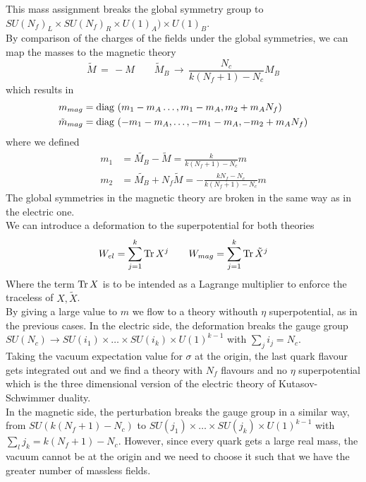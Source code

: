 This mass assignment breaks the global symmetry group to $SU(N_f)_L \times SU(N_f)_R \times U(1)_A) \times U(1)_B$.\\
By comparison of the charges of the fields under the global symmetries, we can map the masses to the magnetic theory
\begin{equation}
 \tilde{M} \, = \, - M \qquad \tilde{M}_B \, \rightarrow \, \frac{N_c}{k (N_f+1) - N_c} M_B
\end{equation}
which results in
\begin{align}
m_{mag} & = \hbox{diag\,} \left( m_1 - m_A \dotsc, m_1 - m_A, m_2 + m_A N_f     \right)\\
\tilde{m}_{mag} & =\hbox{diag\,} \left(    - m_1 - m_A ,\dotsc, - m_1 - m_A, -m_2 + m_A N_f    \right)
\end{align}
where we defined
\begin{align}
m_1 & = \tilde{M_B} - \tilde{M} = \frac{k}{k (N_f +1) - N_c} m\\
m_2 & = \tilde{M_B} + N_f \tilde{M} = - \frac{ k N_f - N_c}{k (N_f +1) - N_c} m
\end{align}
The global symmetries in the magnetic theory are broken in the same way as in the electric one.\\
We can introduce a deformation to the superpotential for both theories
\begin{equation}
 W_{el}= \sum_{j=1}^{k} \mathrm{Tr } \,{ X^{j} } \qquad W_{mag} = \sum_{j=1}^{k} \mathrm{Tr } \,{ \tilde{X}^{j}}
\end{equation}
Where the term $ \mathrm{Tr } \,{X}$ is to be intended as a Lagrange multiplier to enforce the traceless of $X,\tilde{X}$.\\
By giving a large value to $m$ we flow to a theory withouth $\eta$ superpotential, as in the previous cases.
In the electric side, the deformation breaks the gauge group $SU(N_c) \rightarrow SU(i_1) \times \dots \times SU(i_k) \times U(1)^{k-1}$ with $\sum_j i_j = N_c$.\\
Taking the vacuum expectation value for $\sigma$ at the origin, the last quark flavour gets integrated out and we find a theory with $N_f$ flavours and no $\eta$ superpotential which is the three dimensional version of the electric theory of Kutasov-Schwimmer duality.
\\
In the magnetic side, the perturbation breaks the gauge group in a similar way, from $SU( k (N_f+1) - N_c)$ to $SU(j_1) \times \dots \times SU(j_k) \times U(1)^{k-1} $ with $\sum_l j_k = k (N_f+1) - N_c$. 
However, since every quark gets a large real mass, the vacuum cannot be at the origin and we need to choose it such that we have the greater number of massless fields. 

